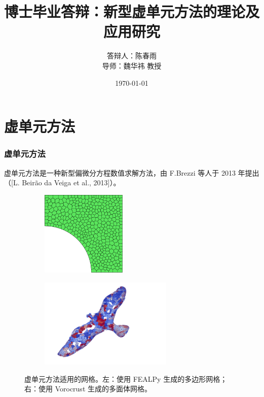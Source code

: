 \documentclass[notheorems,serif]{beamer}
\begin{document}
\title{博士毕业答辩：新型虚单元方法的理论及应用研究}
\author{答辩人：陈春雨\\
\vspace{5pt}
导师：{魏华祎} 教授}


\date
{
    \today
}

\frame[plain]{\titlepage}

\section{虚单元方法}
\begin{frame}
  \frametitle{虚单元方法}
虚单元方法是一种新型偏微分方程数值求解方法，由 
F.Brezzi 等人于 2013 年提出（[L. Beirão da Veiga et al., 2013]）。

\begin{figure}[htbp]
\centering
\begin{subfigure}[t]{0.49\linewidth}
    \centering
    \includegraphics[width=1.6in]{../figures/voronoi_quad_circle.pdf}
\end{subfigure}%
\begin{subfigure}[t]{0.49\linewidth}
    \centering
    \includegraphics[width=2.5in]{../figures/bird.png}
\end{subfigure}%
\caption{虚单元方法适用的网格。左：使用 FEALPy 生成的多边形网格；右：使用
Vorocrust 生成的多面体网格。}
\label{fig:all}
\end{figure}

\end{frame}
\end{document}

